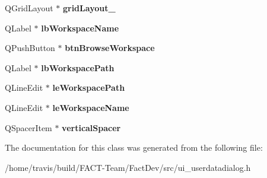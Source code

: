 \begin{DoxyCompactItemize}
\item 
\hypertarget{classUi__UserDataDialog_a173ef85f773b3ec0e1bfda05d0c59f68}{Q\-Grid\-Layout $\ast$ {\bfseries grid\-Layout\-\_}}\label{classUi__UserDataDialog_a173ef85f773b3ec0e1bfda05d0c59f68}

\item 
\hypertarget{classUi__UserDataDialog_ac82681eca5be15d423aff66d3ff7d46c}{Q\-Label $\ast$ {\bfseries lb\-Workspace\-Name}}\label{classUi__UserDataDialog_ac82681eca5be15d423aff66d3ff7d46c}

\item 
\hypertarget{classUi__UserDataDialog_aeeb342aafb70cf354d9b964b3ad7e875}{Q\-Push\-Button $\ast$ {\bfseries btn\-Browse\-Workspace}}\label{classUi__UserDataDialog_aeeb342aafb70cf354d9b964b3ad7e875}

\item 
\hypertarget{classUi__UserDataDialog_a320a48804f37490c881ada37665b959a}{Q\-Label $\ast$ {\bfseries lb\-Workspace\-Path}}\label{classUi__UserDataDialog_a320a48804f37490c881ada37665b959a}

\item 
\hypertarget{classUi__UserDataDialog_a3b4bca615c849ad75c62836d917df6ad}{Q\-Line\-Edit $\ast$ {\bfseries le\-Workspace\-Path}}\label{classUi__UserDataDialog_a3b4bca615c849ad75c62836d917df6ad}

\item 
\hypertarget{classUi__UserDataDialog_ae629443fe3f3c858b060e66d0d532f1c}{Q\-Line\-Edit $\ast$ {\bfseries le\-Workspace\-Name}}\label{classUi__UserDataDialog_ae629443fe3f3c858b060e66d0d532f1c}

\item 
\hypertarget{classUi__UserDataDialog_a1c040be6cf1c60c5084bfab2810463ba}{Q\-Spacer\-Item $\ast$ {\bfseries vertical\-Spacer}}\label{classUi__UserDataDialog_a1c040be6cf1c60c5084bfab2810463ba}

\end{DoxyCompactItemize}


The documentation for this class was generated from the following file\-:\begin{DoxyCompactItemize}
\item 
/home/travis/build/\-F\-A\-C\-T-\/\-Team/\-Fact\-Dev/src/ui\-\_\-userdatadialog.\-h\end{DoxyCompactItemize}
